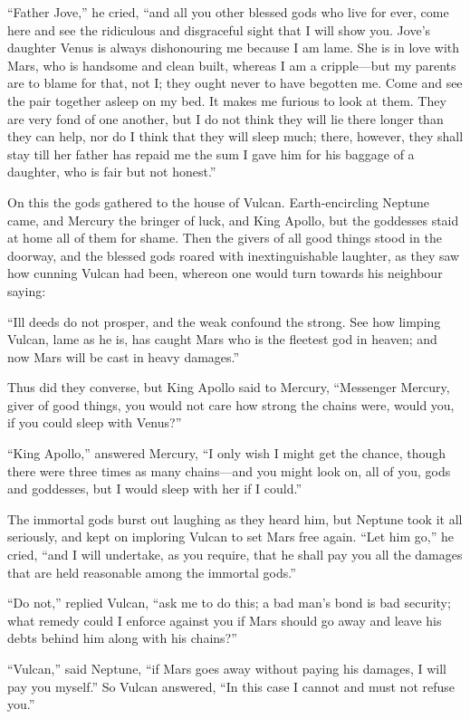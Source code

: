 “Father Jove,” he cried, “and all you other blessed gods who live for ever,
come here and see the ridiculous and disgraceful sight that I will show you.
Jove’s daughter Venus is always dishonouring me because I am lame. She is in
love with Mars, who is handsome and clean built, whereas I am a cripple—but my
parents are to blame for that, not I; they ought never to have begotten me.
Come and see the pair together asleep on my bed. It makes me furious to look at
them. They are very fond of one another, but I do not think they will lie there
longer than they can help, nor do I think that they will sleep much; there,
however, they shall stay till her father has repaid me the sum I gave him for
his baggage of a daughter, who is fair but not honest.”

On this the gods gathered to the house of Vulcan. Earth-encircling Neptune
came, and Mercury the bringer of luck, and King Apollo, but the goddesses staid
at home all of them for shame. Then the givers of all good things stood in the
doorway, and the blessed gods roared with inextinguishable laughter, as they
saw how cunning Vulcan had been, whereon one would turn towards his neighbour
saying:

“Ill deeds do not prosper, and the weak confound the strong. See how limping
Vulcan, lame as he is, has caught Mars who is the fleetest god in heaven; and
now Mars will be cast in heavy damages.”

Thus did they converse, but King Apollo said to Mercury, “Messenger Mercury,
giver of good things, you would not care how strong the chains were, would you,
if you could sleep with Venus?”

“King Apollo,” answered Mercury, “I only wish I might get the chance, though
there were three times as many chains—and you might look on, all of you, gods
and goddesses, but I would sleep with her if I could.”

The immortal gods burst out laughing as they heard him, but Neptune took it all
seriously, and kept on imploring Vulcan to set Mars free again. “Let him go,”
he cried, “and I will undertake, as you require, that he shall pay you all the
damages that are held reasonable among the immortal gods.”

“Do not,” replied Vulcan, “ask me to do this; a bad man’s bond is bad security;
what remedy could I enforce against you if Mars should go away and leave his
debts behind him along with his chains?”

“Vulcan,” said Neptune, “if Mars goes away without paying his damages, I will
pay you myself.” So Vulcan answered, “In this case I cannot and must not refuse
you.”

